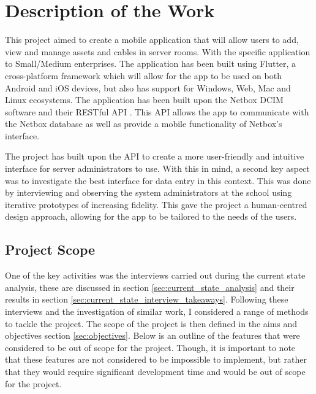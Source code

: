 \documentclass [11pt,a4paper]{article}
\begin{document}
\section{Description of the Work}
\label{sec:work}
This project aimed to create a mobile application that will allow users to add, view and manage assets and cables in server rooms. With the specific application to Small/Medium enterprises. The application has been built using Flutter, a cross-platform framework which will allow for the app to be used on both Android and iOS devices, but also has support for Windows, Web, Mac and Linux ecosystems. The application has been built upon the Netbox DCIM software \cite{Netbox} and their RESTful API \cite{NetboxAPI}. This API allows the app to communicate with the Netbox database as well as provide a mobile functionality of Netbox's interface.  

The project has built upon the API to create a more user-friendly and intuitive interface for server administrators to use. With this in mind, a second key aspect was to investigate the best interface for data entry in this context. This was done by interviewing and observing the system administrators at the school using iterative prototypes of increasing fidelity. This gave the project a human-centred design approach, allowing for the app to be tailored to the needs of the users.

\subsection{Project Scope}
\label{sec:project_scope}
One of the key activities was the interviews carried out during the current state analysis, these are discussed in section \ref{sec:current_state_analysis} and their results in section \ref{sec:current_state_interview_takeaways}. Following these interviews and the investigation of similar work, I considered a range of methods to tackle the project. The scope of the project is then defined in the aims and objectives section \ref{sec:objectives}. Below is an outline of the features that were considered to be out of scope for the project. Though, it is important to note that these features are not considered to be impossible to implement, but rather that they would require significant development time and would be out of scope for the project. 
\end{document}

